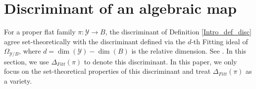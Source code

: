 \documentclass[12pt]{amsart}
\begin{document}

\section{Discriminant of an algebraic map}\label{sec_disc}
For a proper flat family $\pi:\mathcal Y\to B$, the discriminant of Definition \ref{Intro_def_disc} agree set-theoretically with the discriminant defined via the $d$-th Fitting ideal of $\Omega_{\mathcal Y/B}$, where $d=\dim(\mathcal Y)-\dim(B)$ is the relative dimension. See \cite{Tei77} \cite[\href{https://stacks.math.columbia.edu/tag/0C3K}{0C3K}]{stacks-project}. In this section, we use $\Delta_{Fitt}(\pi)$ to denote this discriminant. In this paper, we only focus on the set-theoretical properties of this discriminant and treat $\Delta_{Fitt}(\pi)$ as a variety.
\end{document}

